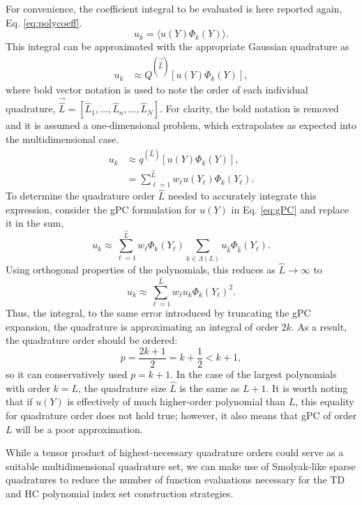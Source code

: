 For convenience, the coefficient integral to be evaluated is here reported again, Eq.
\ref{eq:polycoeff}.
\begin{equation}
  u_k = \langle u(Y)\Phi_k(Y) \rangle.
\end{equation}
This integral can be approximated with the appropriate Gaussian quadrature as
\begin{align}
  u_k &\approx Q^{(\vec{\hat L})}[u(Y)\Phi_k(Y)],
\end{align}
where bold vector notation is used to note the order of each individual quadrature,
$\vec{\hat L} = [\hat L_1, \ldots,\hat L_n,\ldots,\hat L_N]$. For clarity, the bold notation is removed and
it is assumed a one-dimensional problem, which extrapolates as expected into the multidimensional case.
\begin{align}
  u_k &\approx q^{(\hat L)}[u(Y)\Phi_k(Y)],\\
      &= \sum_{\ell=1}^{\hat L} w_\ell u(Y_\ell)\Phi_k(Y_\ell).
\end{align}
To determine the quadrature order $\hat L$ needed to accurately integrate this expression, consider the
gPC formulation for $u(Y)$ in Eq. \ref{eq:gPC} and replace it in the sum,
\begin{equation}
  u_k\approx \sum_{\ell=1}^{\hat L} w_\ell \Phi_k(Y_\ell) \sum_{k\in\Lambda(L)}u_{\hat k}\Phi_{\hat k}(Y_\ell).
\end{equation}
Using orthogonal properties of the polynomials, this reduces as $\hat L\to\infty$ to
\begin{equation}
  u_k\approx \sum_{\ell=1}^{\hat L} w_\ell u_k \Phi_k(Y_\ell)^2.
\end{equation}
Thus, the integral, to the same error introduced by truncating the  gPC expansion, the quadrature is
approximating an integral of order $2k$. As a result, the quadrature order should be ordered:
\begin{equation}
  p=\frac{2k+1}{2}=k+\frac{1}{2}<k+1,
\end{equation}
so it  can conservatively used  $p=k+1$.  In the case of the largest polynomials with order
$k=L$, the quadrature size $\hat L$ is the same as $L+1$.  It is worth noting that if $u(Y)$ is effectively of
much higher-order polynomial than $L$, this equality for quadrature order does not hold true; however, it also
means that gPC of order $L$ will be a poor approximation.

While a tensor product of highest-necessary quadrature orders could serve as a suitable multidimensional
quadrature set, we can make use of Smolyak-like sparse quadratures to reduce the number of function
evaluations necessary for the TD and HC polynomial index set construction strategies.

